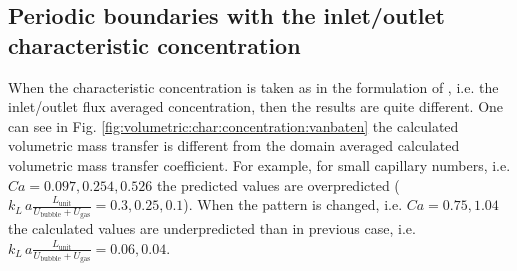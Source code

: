 \documentclass{article}
\newcommand{\vol}{k_L\,a}
\newcommand{\lunit}{L_{\mathrm{unit}}}
\newcommand{\ububble}{U_{\mathrm{bubble}}}
\newcommand{\ugas}{U_{\mathrm{gas}}}
\newcommand{\volnondim}{\vol \frac{\lunit}{\ububble+\ugas}}
\begin{document}
\subsection{Periodic boundaries with the inlet/outlet characteristic concentration}
When the characteristic concentration is taken as in the formulation of \citet{vanbaten-circular},
i.e. the inlet/outlet flux averaged concentration, then the results are quite different. One can
see in Fig. \ref{fig:volumetric:char:concentration:vanbaten} the calculated volumetric mass transfer
is different from the domain averaged calculated volumetric mass transfer coefficient. For example,
for small capillary numbers, i.e. $Ca=0.097,0.254,0.526$ the predicted values are overpredicted
($\volnondim=0.3,0.25,0.1$). When the pattern is changed, i.e. $Ca=0.75,1.04$ the calculated values
are underpredicted than in previous case, i.e. $\volnondim=0.06,0.04$.
\end{document}
